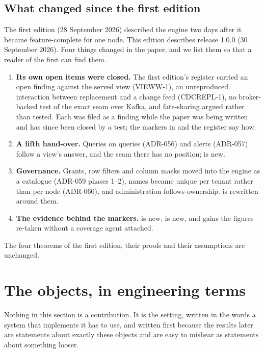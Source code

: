 \documentclass[11pt,a4paper]{article}
\renewcommand{\_}{\oldunderscore\allowbreak}
\begin{document}
\subsection{What changed since the first edition}

The first edition (28 September 2026) described the engine two days after it became feature-complete
for one node. This edition describes release 1.0.0 (30 September 2026). Four things changed in the
paper, and we list them so that a reader of the first can find them.
\begin{enumerate}[leftmargin=*,itemsep=2pt]
\item \textbf{Its own open items were closed.} The first edition's register carried an open finding
      against the served view (VIEWW-1), an unreproduced interaction between replacement and a change
      feed (CDCREPL-1), no broker-backed test of the exact seam over Kafka, and fate-sharing argued rather
      than tested. Each was filed as a finding while the paper was being written and has since been closed
      by a test; the markers in  and the register say how.
\item \textbf{A fifth hand-over.} Queries on queries (ADR-056) and alerts (ADR-057) follow a view's
      answer, and the seam there has no position;  is new.
\item \textbf{Governance.} Grants, row filters and column masks moved into the engine as a catalogue
      (ADR-059 phases 1--2), names became unique per tenant rather than per node (ADR-060), and
      administration follows ownership.  is rewritten around them.
\item \textbf{The evidence behind the markers.}  is new,  is new,
      and  gains the figures re-taken without a coverage agent attached.
\end{enumerate}
The four theorems of the first edition, their proofs and their assumptions are unchanged.

\section{The objects, in engineering terms}\label{sec:objects}

Nothing in this section is a contribution. It is the setting, written in the words a system that
implements it has to use, and written first because the results later are statements about exactly
these objects and are easy to mishear as statements about something looser.
\end{document}
